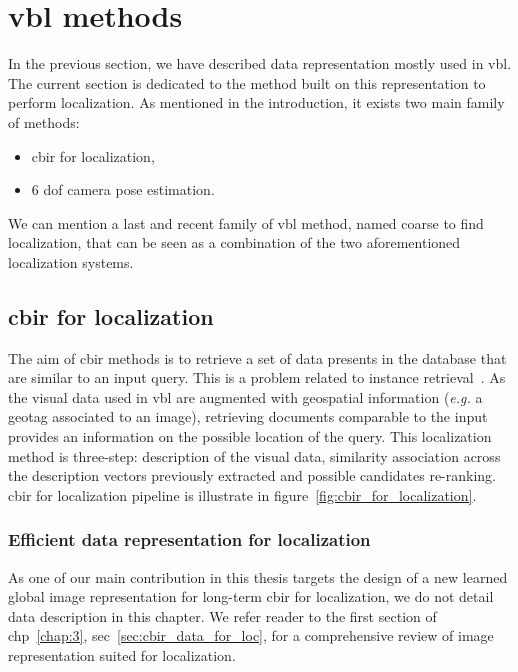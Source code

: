 \section{\acs*{vbl} methods}

In the previous section, we have described data representation mostly used in \ac{vbl}. The current section is dedicated to the method built on this representation to perform localization. As mentioned in the introduction, it exists two main family of methods:
\begin{itemize}
	\item \Acf{cbir} for localization,
	\item 6 \ac{dof} camera pose estimation.
\end{itemize}

We can mention a last and recent family of \ac{vbl} method, named coarse to find localization, that can be seen as a combination of the two aforementioned localization systems.
\label{sec:vbl_methods}
	
\subsection{\acs*{cbir} for localization}


\label{subsec:vbl_as_image_retrieval}
The aim of \ac{cbir} methods is to retrieve a set of data presents in the database that are similar to an input query. This is a problem related to instance retrieval~\citep{Zheng2017}. As the visual data used in \ac{vbl} are augmented with geospatial information (\textit{e.g.} a geotag associated to an image), retrieving documents comparable to the input provides an information on the possible location of the query. This localization method is three-step: description of the visual data, similarity association across the description vectors previously extracted and possible candidates re-ranking. \acs*{cbir} for localization pipeline is illustrate in figure~\ref{fig:cbir_for_localization}.

\subsubsection{Efficient data representation for localization}
As one of our main contribution in this thesis targets the design of a new learned global image representation for long-term \ac{cbir} for localization, we do not detail data description in this chapter. We refer reader to the first section of \acl{chp}~\ref{chap:3}, \acs{sec}~\ref{sec:cbir_data_for_loc}, for a comprehensive review of image representation suited for localization.

